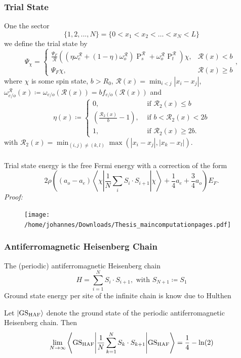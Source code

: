 \documentclass{beamer}[10]
\newcommand{\abs}[1]{\left\lvert #1 \right\rvert}
\renewcommand{\braket}[1]{\left\langle#1\right\rangle}
\begin{document}
\begin{frame}
	\frametitle{Trial State}
	\small One the sector
	$$ \{1,2,...,N\}=\{0<x_{1}<x_{2}<\ldots<x_{N}<L\} $$
	we define the trial state by 
	\begin{equation}\label{EqTrial StateSpin1/2Fermi}
		\Psi_\chi=\begin{cases}
			\frac{\Psi_F}{\mathcal{R}}\left(\left(\eta\omega^{\mathcal{R}}_e+(1-\eta)\omega^{\mathcal{R}}_o\right)\operatorname{P}_s^{\mathcal{R}}+\omega_o^{\mathcal{R}}\operatorname{P}_t^{\mathcal{R}}\right)\chi,&\mathcal{R}(x)<b\\
			\Psi_F\chi ,&\mathcal{R}(x)\geq b
		\end{cases},
	\end{equation}
where $ \chi $ is some spin state, $ b>R_0 $, $ \mathcal{R}(x)=\min_{i<j}\abs{x_i-x_j} $, $ \omega^\mathcal{R}_{e/o}(x)\coloneqq \omega_{e/o}(\mathcal{R}(x))=bf_{e/o}(\mathcal{R}(x)) $ and 
\begin{equation}
	\eta(x)\coloneqq\begin{cases}
		0,&\text{ if } \mathcal{R}_2(x)\leq b\\
		\left(\frac{\mathcal{R}_2(x)}{b}-1\right), &\text{ if } b<\mathcal{R}_2(x)<2b\\
		1, &\text{ if } \mathcal{R}_2(x)\geq 2b.
	\end{cases}
\end{equation}
with $ \mathcal{R}_2(x)=\min_{(i,j)\neq (k,l)}\max(\abs{x_i-x_j},\abs{x_k-x_l}) $.
\end{frame}

\begin{frame}
	\frametitle{}
	\vspace*{1cm}
		\small Trial state energy is the free Fermi energy with a correction of the form
	$$
	2\rho\left( (a_o-a_e) \braket{\chi \left\vert \frac{1}{N}\sum_{i}S_i\cdot S_{i+1} \right\vert \chi} +\frac{1}{4}a_e+\frac{3}{4}a_o \right)E_F.
	$$ 
	\emph{Proof:}\vspace*{-0.1cm}
	\begin{figure}[h!]
		\texttt{[image: /home/johannes/Downloads/Thesis\_maincomputationpages.pdf]}
	\end{figure}
\end{frame}

\begin{frame}
	\frametitle{Antiferromagnetic Heisenberg Chain}
	The (periodic) antiferromagnetic Heisenberg chain 
	$$
	H=\sum_{i=1}^{N}S_i\cdot S_{i+1}, \text{ with } S_{N+1}\coloneqq S_1
	$$
 Ground state energy per site of the infinite chain is know due to Hulthen
 \begin{lemma} \label{LemmaHeisenbergChainThermodynamicGSEnergy}
 	Let $ \ket{\textnormal{GS}_{\textnormal{HAF}}} $ denote the ground state of the periodic antiferromagnetic Heisenberg chain. Then\begin{equation}
 		\lim\limits_{N\to\infty}\braket{\textnormal{GS}_{\textnormal{HAF}}\Bigg\vert\frac{1}{N}\sum_{k=1}^N S_k\cdot S_{k+1} \Bigg\vert \textnormal{GS}_{\textnormal{HAF}}}=\frac{1}{4}-\ln(2) 
 	\end{equation}
 \end{lemma}
\end{frame}
\end{document}
